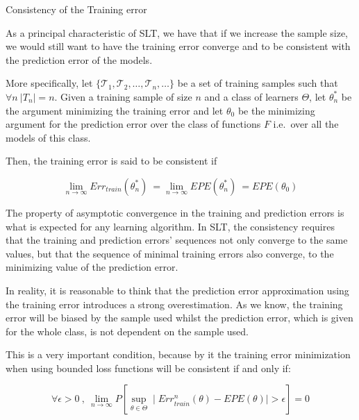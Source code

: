 \begin{appendices}
\begin{definition}{Consistency of the Training error}

As a principal characteristic of SLT, we have that if we increase the sample size, we would still want to have the training error converge and to be consistent with the prediction error of the models.

More specifically, let $\{\mathcal {T}_1, \mathcal {T}_2, \ldots, \mathcal {T}_n, \ldots \}$ be a set of training samples such that $\forall n \ |T_n|=n$.
Given a training sample of size $n$ and a class of learners $\Theta$, let $\theta^{*}_n$ be the argument minimizing the training error and let $\theta_0$ be the minimizing argument for the prediction error over the class of functions $F$ i.e.\ over all the models of this class.

Then, the training error is said to be consistent if

\begin{equation}
\lim_{n\to\infty} Err_{train}(\theta^{*}_n) \ = \lim_{n\to\infty} EPE(\theta^{*}_n) \ = EPE(\theta_0)
\end{equation}

\end{definition}

The property of asymptotic convergence in the training and prediction errors is what is expected for any learning algorithm.
In SLT, the consistency requires that the training and prediction errors' sequences not only converge to the same values, but that the sequence of minimal training errors also converge, to the minimizing value of the prediction error.

In reality, it is reasonable to think that the  prediction error approximation using the training error introduces a strong overestimation.
As we know, the training error will be biased by the sample used whilst the prediction error, which is given for the whole class, is not dependent on the sample used.

This is a very important condition, because by it the training error minimization when using bounded loss functions will be consistent if and only if:


\begin{equation}
\forall \epsilon > 0 \ , \ \lim_{n\to\infty} P\left[ \sup_{\theta \in \Theta} \mid Err^{n}_{train}(\theta) - EPE(\theta) \mid  > \epsilon  \right] = 0
\end{equation}


\end{appendices}
